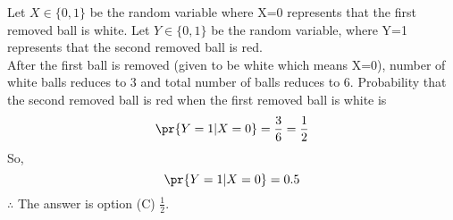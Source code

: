 Let $X\in\{0,1\}$ be the random variable where X=0 represents that the first removed ball is white.
Let $Y\in\{0,1\}$ be the random variable, where Y=1 represents that the second removed ball is red.\\
After the first ball is removed (given to be white which means X=0), 
number of white balls reduces to 3 and total number of balls reduces to 6.
Probability that the second removed ball is red when the first removed ball is white is 
\begin{align}
 \pr{Y=1|X=0}= \frac{3}{6} = \frac{1}{2} 
\end{align}
So,
\begin{equation}
 \pr{Y=1|X=0} = 0.5
\end{equation}
$\therefore$ The answer is option (C) $\frac{1}{2}$.
